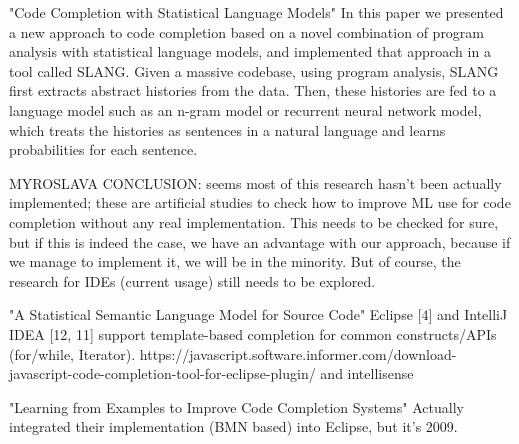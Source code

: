 "Code Completion with Statistical Language Models"
In this paper we presented a new approach to code completion based on a novel combination
of program analysis with statistical language models, and implemented that approach in a tool
called SLANG. Given a massive codebase, using program analysis, SLANG ﬁrst extracts abstract
histories from the data. Then, these histories are fed to a language model such as an n-gram
model or recurrent neural network model, which treats the histories as sentences in a natural
language and learns probabilities for each sentence.

MYROSLAVA CONCLUSION: seems most of this research hasn't been actually implemented; these are artificial
studies to check how to improve ML use for code completion without any real implementation.
This needs to be checked for sure, but if this is indeed the case, we have an advantage with our
approach, because if we manage to implement it, we will be in the minority. But of course, the
research for IDEs (current usage) still needs to be explored.

"A Statistical Semantic Language Model for Source Code"
Eclipse [4] and IntelliJ IDEA [12, 11] support template-based completion for common
constructs/APIs (for/while, Iterator).
https://javascript.software.informer.com/download-javascript-code-completion-tool-for-eclipse-plugin/
and intellisense

"Learning from Examples to Improve Code Completion Systems"
Actually integrated their implementation (BMN based) into Eclipse, but it's 2009.

